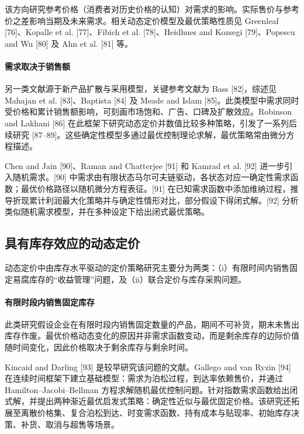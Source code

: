 该方向研究参考价格（消费者对历史价格的认知）对需求的影响。实际售价与参考价之差影响当期及未来需求。相关动态定价模型及最优策略性质见 Greenleaf [76]、Kopalle et al. [77]、Fibich et al. [78]、Heidhues and Kozsegi [79]、Popescu and Wu [80] 及 Ahn et al. [81] 等。

\paragraph{需求取决于销售额}\label{demand-depends-on-amount-of-sales}

另一类文献源于新产品扩散与采用模型，关键参考文献为 Bass [82]，综述见 Mahajan et al. [83]、Baptista [84] 及 Meade and Islam [85]。此类模型中需求同时受价格和累计销售额影响，可刻画市场饱和、广告、口碑及扩散效应。Robinson and Lakhani [86] 在此框架下研究动态定价并数值比较多种策略，引发了一系列后续研究 [87–89]。这些确定性模型多通过最优控制理论求解，最优策略常由微分方程描述。

Chen and Jain [90]、Raman and Chatterjee [91] 和 Kamrad et al. [92] 进一步引入随机需求。[90] 中需求由有限状态马尔可夫链驱动，各状态对应一确定性需求函数；最优价格路径以随机微分方程表征。[91] 在已知需求函数中添加维纳过程，推导折现累计利润最大化策略并与确定性情形对比，部分假设下得闭式解。[92] 分析类似随机需求模型，并在多种设定下给出闭式最优策略。

\subsection{具有库存效应的动态定价}\label{dynamic-pricing-with-inventory-effects}

动态定价中由库存水平驱动的定价策略研究主要分为两类：（i）有限时间内销售固定易腐库存的“收益管理”问题，及（ii）联合定价与库存采购问题。

\paragraph{有限时段内销售固定库存}\label{selling-a-fixed-finite-inventory-during-a-finite-time-period}

此类研究假设企业在有限时段内销售固定数量的产品，期间不可补货，期末未售出库存作废。最优价格动态变化的原因并非需求函数变动，而是剩余库存的边际价值随时间变化，因此价格取决于剩余库存与剩余时间。

Kincaid and Darling [93] 是较早研究该问题的文献。Gallego and van Ryzin [94] 在连续时间框架下建立基础模型：需求为泊松过程，到达率依赖售价，并通过 Hamilton–Jacobi–Bellman 方程求解随机最优控制问题。针对指数需求函数给出闭式解，并提出两种渐近最优启发式策略：确定性近似与最优固定价格。该研究还拓展至离散价格集、复合泊松到达、时变需求函数、持有成本与贴现率、初始库存决策、补货、取消与超售等场景。

